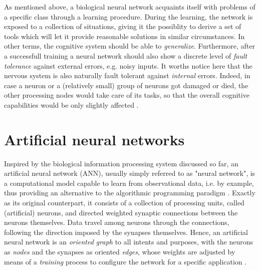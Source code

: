 \documentclass[11pt, a4paper]{report}
\theoremstyle{theorem}
\numberwithin{equation}{section}
\numberwithin{figure}{section}
\begin{document}
		 As mentioned above, a biological neural network acquaints itself with problems of a specific class through a learning procedure. During the learning, the network is exposed to a collection of situations, giving it the possiblity to derive a set of tools which will let it provide reasonable solutions in similar circumstances. In other terms, the cognitive system should be able to \emph{generalize}. Furthermore, after a successfull training a neural network should also show a discrete level of \emph{fault tolerance} against external errors, e.g. noisy inputs. It worths notice here that the nervous system is also naturally fault tolerant against \emph{internal} errors. Indeed, in case a neuron or a (relatively small) group of neurons got damaged or died, the other processing nodes would take care of its tasks, so that the overall cognitive capabilities would be only slightly affected \cite{Kri}. 
		 
		
	\section{Artificial neural networks}
	\label{section:Artificial neural networks}
			
		Inspired by the biological information processing system discussed so far, an artificial neural network (ANN), usually simply referred to as "neural network", is a computational model capable to learn from observational data, i.e. by example, thus providing an alternative to the algorithmic programming paradigm \cite{Nie15}. Exactly as its original counterpart, it consists of a collection of processing units, called (artificial) neurons, and directed weighted synaptic connections between the neurons themselves. Data travel among neurons through the connections, following the direction imposed by the synapses themselves. Hence, an artificial neural network is an \emph{oriented graph} to all intents and purposes, with the neurons as \emph{nodes} and the synapses as oriented \emph{edges}, whose weights are adjusted by means of a \emph{training} process to configure the network for a specific application \cite{SD}. 
		
\end{document}
